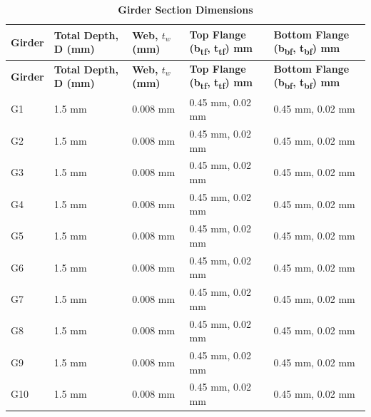 \documentclass[12pt,a4paper]{report}
\numberwithin{table}{chapter}
\numberwithin{figure}{chapter}
\newcommand{\ReportTableRowGap}{6pt}
\begin{document}
\vspace{4pt}
\begin{longtable}{|L{1.8cm}|L{2.3cm}|L{1.8cm}|p{4.8cm}|p{4.8cm}|}
\caption{\textbf{Girder Section Dimensions}}\\
\hline
\textbf{Girder} & \textbf{Total Depth, D (mm)} & \textbf{Web, $t_w$ (mm)} & \textbf{Top Flange (b\textsubscript{tf}, t\textsubscript{tf}) mm} & \textbf{Bottom Flange (b\textsubscript{bf}, t\textsubscript{bf}) mm} \\[\ReportTableRowGap]
\hline
\endfirsthead
\hline
\textbf{Girder} & \textbf{Total Depth, D (mm)} & \textbf{Web, $t_w$ (mm)} & \textbf{Top Flange (b\textsubscript{tf}, t\textsubscript{tf}) mm} & \textbf{Bottom Flange (b\textsubscript{bf}, t\textsubscript{bf}) mm} \\[\ReportTableRowGap]
\hline
\endhead

G1 & 1.5 mm & 0.008 mm & 0.45 mm, 0.02 mm & 0.45 mm, 0.02 mm \\[8pt]
\hline
G2 & 1.5 mm & 0.008 mm & 0.45 mm, 0.02 mm & 0.45 mm, 0.02 mm \\[8pt]
\hline
G3 & 1.5 mm & 0.008 mm & 0.45 mm, 0.02 mm & 0.45 mm, 0.02 mm \\[8pt]
\hline
G4 & 1.5 mm & 0.008 mm & 0.45 mm, 0.02 mm & 0.45 mm, 0.02 mm \\[8pt]
\hline
G5 & 1.5 mm & 0.008 mm & 0.45 mm, 0.02 mm & 0.45 mm, 0.02 mm \\[8pt]
\hline
G6 & 1.5 mm & 0.008 mm & 0.45 mm, 0.02 mm & 0.45 mm, 0.02 mm \\[8pt]
\hline
G7 & 1.5 mm & 0.008 mm & 0.45 mm, 0.02 mm & 0.45 mm, 0.02 mm \\[8pt]
\hline
G8 & 1.5 mm & 0.008 mm & 0.45 mm, 0.02 mm & 0.45 mm, 0.02 mm \\[8pt]
\hline
G9 & 1.5 mm & 0.008 mm & 0.45 mm, 0.02 mm & 0.45 mm, 0.02 mm \\[8pt]
\hline
G10 & 1.5 mm & 0.008 mm & 0.45 mm, 0.02 mm & 0.45 mm, 0.02 mm \\[8pt]
\hline
\end{longtable}

\vspace{0.6em}
\end{document}

